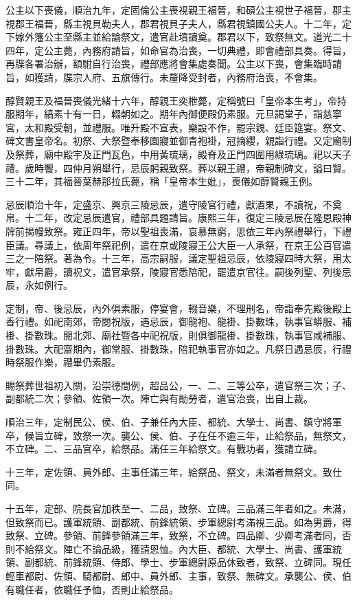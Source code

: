 \begin{pinyinscope}
公主以下喪儀，順治九年，定固倫公主喪視親王福晉，和碩公主視世子福晉，郡主視郡王福晉，縣主視貝勒夫人，郡君視貝子夫人，縣君視鎮國公夫人。十二年，定下嫁外籓公主至縣主並給諭祭文，遣官赴墳讀奠。郡君以下，致祭無文。道光二十四年，定公主薨，內務府請旨，如命官為治喪，一切典禮，即會禮部具奏。得旨，再牒各署治辦，額駙自行治喪，禮部應將會集處奏聞。公主以下喪，會集臨時請旨，如獲請，牒宗人府、五旗傳行。未釐降受封者，內務府治喪，不會集。

醇賢親王及福晉喪儀光緒十六年，醇親王奕枻薨，定稱號曰「皇帝本生考」，帝持服期年，縞素十有一日，輟朝如之。期年內御便殿仍素服。元旦謁堂子，詣慈寧宮，太和殿受朝，並禮服。唯升殿不宣表，樂設不作，罷宗親、廷臣筵宴。祭文、碑文書皇帝名。初祭、大祭暨奉移園寢並御青袍褂，冠摘纓，親詣行禮。又定廟制及祭葬，廟中殿宇及正門瓦色，中用黃琉璃，殿脊及正門四圍用綠琉璃。祀以天子禮。歲時饗，四仲月朔舉行，忌辰躬親致祭。葬以親王禮，帝親制碑文，謚曰賢。三十二年，其福晉葉赫那拉氏薨，稱「皇帝本生妣」，喪儀如醇賢親王例。

忌辰順治十年，定盛京、興京三陵忌辰，遣守陵官行禮，獻酒果，不讀祝，不奠帛。十二年，改定忌辰遣官，禮部具題請旨。康熙三年，復定三陵忌辰在隆恩殿神牌前揭幔致祭。雍正四年，帝以聖祖喪滿，哀慕無窮，思依三年內祭禮舉行，下禮臣議。尋議上，依周年祭祀例，遣在京或陵寢王公大臣一人承祭，在京王公百官遣三之一陪祭。著為令。十三年，高宗嗣服，議定聖祖忌辰，依陵寢四時大祭，用太牢，獻帛爵，讀祝文，遣官承祭，陵寢官悉陪祀，罷遣京官往。嗣後列聖、列後忌辰，永如例行。

定制，帝、後忌辰，內外俱素服，停宴會，輟音樂，不理刑名，帝詣奉先殿後殿上香行禮。如祀南郊，帝閱祝版，遇忌辰，御龍袍、龍褂、掛數珠，執事官蟒服、補褂、掛數珠。閱北郊、廟社暨各中祀祝版，則俱御龍褂、掛數珠，執事官咸補服、掛數珠。大祀齋期內，御常服、掛數珠，陪祀執事官亦如之。凡祭日遇忌辰，行禮時祭服作樂，禮畢仍素服。

賜祭葬世祖初入關，沿崇德間例，超品公，一、二、三等公卒，遣官祭三次；子、副都統二次；參領、佐領一次。陣亡與有勛勞者，遣官治喪，出自上裁。

順治三年，定制民公、侯、伯、子兼任內大臣、都統、大學士、尚書、鎮守將軍卒，候旨立碑，致祭一次。襲公、侯、伯、子在任不逾三年，止給祭品，無祭文，不立碑。二、三品官卒，給祭品。滿任三年給祭文。有戰功者，獲請立碑。

十三年，定佐領、員外郎、主事任滿三年，給祭品、祭文，未滿者無祭文。致仕同。

十五年，定部、院長官加秩至一、二品，致祭、立碑。三品滿三年者如之。未滿，但致祭而已。護軍統領、副都統、前鋒統領、步軍總尉考滿視三品。如為男爵，得致祭、立碑。參領、前鋒參領滿三年，致祭，不立碑。四品卿、少卿考滿者同，否則不給祭文。陣亡不論品級，獲請恩恤。內大臣、都統、大學士、尚書、護軍統領、副都統、前鋒統領、侍郎、學士、步軍總尉原品休致者，致祭、立碑同。現任輕車都尉、佐領、騎都尉、郎中、員外郎、主事，致祭、無碑文。承襲公、侯、伯有職任者，依職任予恤，否則止給祭品。


\end{pinyinscope}

